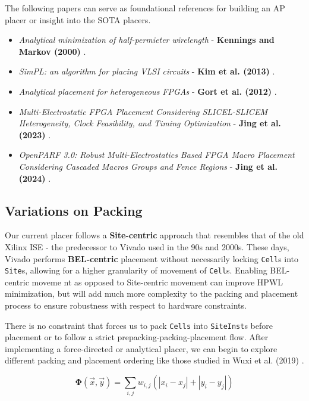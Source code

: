 The following papers can serve as foundational references for building an AP placer or insight into the SOTA placers.
\begin{itemize}
    \item \emph{Analytical minimization of half-permieter wirelength} - \textbf{Kennings and Markov (2000)} \cite{AP_2000}.
    \item \emph{SimPL: an algorithm for placing VLSI circuits} - \textbf{Kim et al. (2013)} \cite{SimPL}.
    \item \emph{Analytical placement for heterogeneous FPGAs} - \textbf{Gort et al. (2012)} \cite{AP_2012}.
    \item \emph{Multi-Electrostatic FPGA Placement Considering SLICEL-SLICEM Heterogeneity, Clock Feasibility, and Timing Optimization} - \textbf{Jing et al. (2023)} \cite{MultiElectrostatic}.
    \item \emph{OpenPARF 3.0: Robust Multi-Electrostatics Based FPGA Macro Placement Considering Cascaded Macros Groups and Fence Regions} - \textbf{Jing et al. (2024)} \cite{OpenPARF}.
\end{itemize}





\subsection{Variations on Packing}
Our current placer follows a \textbf{Site-centric} approach that resembles that of the old Xilinx ISE - the predecessor to Vivado used in the 90s and 2000s.
These days, Vivado performs \textbf{BEL-centric} placement without necessarily locking \texttt{Cell}s into \texttt{Site}s, allowing for a higher granularity of movement of \texttt{Cell}s. 
Enabling BEL-centric moveme
nt as opposed to Site-centric movement can improve HPWL minimization, but will add much more complexity to the packing and placement process to ensure robustness with respect to hardware constraints.

There is no constraint that forces us to pack \texttt{Cells} into \texttt{SiteInst}s before placement or to follow a strict prepacking-packing-placement flow. 
After implementing a force-directed or analytical placer, we can begin to explore different packing and placement ordering like those studied in Wuxi et al. (2019) \cite{ExplicitPacking}.


\begin{equation}
    \boldsymbol{\Phi} (\vec{x}, \vec{y}) = \sum_{i, j} w_{i, j} ( |x_i - x_j| + |y_i - y_j| )
\end{equation}

